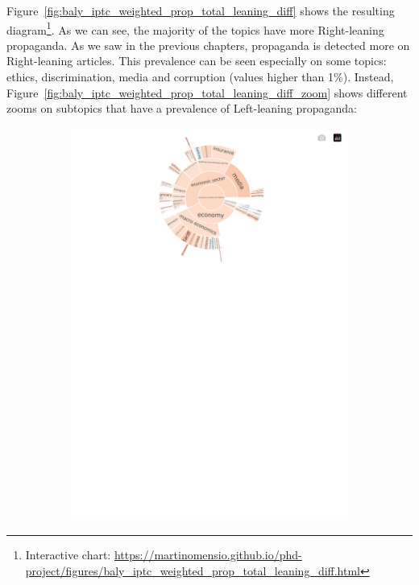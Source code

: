 Figure~\ref{fig:baly_iptc_weighted_prop_total_leaning_diff}  shows the resulting diagram\footnote{Interactive chart: \url{https://martinomensio.github.io/phd-project/figures/baly_iptc_weighted_prop_total_leaning_diff.html}}.
As we can see, the majority of the topics have more Right-leaning propaganda. As we saw in the previous chapters, propaganda is detected more on Right-leaning articles.
This prevalence can be seen especially on some topics: ethics, discrimination, media and corruption (values higher than 1\%).
Instead, Figure~\ref{fig:baly_iptc_weighted_prop_total_leaning_diff_zoom} shows different zooms on subtopics that have a prevalence of Left-leaning propaganda:

\begin{figure}[!htbp]
    \centering
	\begin{subfigure}{0.45\textwidth}
		\includegraphics[trim={0 0 0 0},clip,width=\linewidth]{figures/baly_iptc_weighted_prop_total_leaning_diff_zoom_economy.pdf}

\end{subfigure}
\end{figure}
